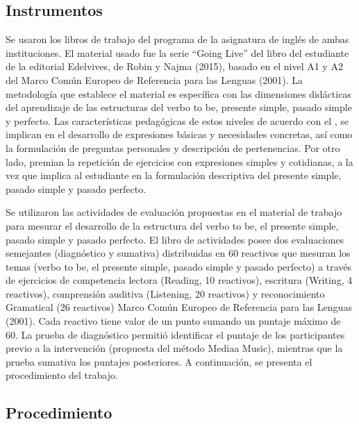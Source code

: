 \documentclass[spanish]{textolivre}
\begin{document}
\subsection{Instrumentos}

Se usaron los libros de trabajo del programa de la asignatura de inglés de ambas instituciones. El material usado fue la serie “Going Live” del libro del estudiante de la editorial Edelvives, de Robin y Najma (2015), basado en el nivel A1 y A2 del Marco Común Europeo de Referencia para las Lenguas (2001). La metodología que establece el material es específica con las dimensiones didácticas del aprendizaje de las estructuras del verbo to be, presente simple, pasado simple y perfecto. Las características pedagógicas de estos niveles de acuerdo con el \textcite{mcerl2001}, se implican en el desarrollo de expresiones básicas y necesidades concretas, así como la formulación de preguntas personales y descripción de pertenencias. Por otro lado, premian la repetición de ejercicios con expresiones simples y cotidianas, a la vez que implica al estudiante en la formulación descriptiva del presente simple, pasado simple y pasado perfecto.

Se utilizaron las actividades de evaluación propuestas en el material de trabajo para mesurar el desarrollo de la estructura del verbo to be, el presente simple, pasado simple y pasado perfecto. El libro de actividades posee dos evaluaciones semejantes (diagnóstico y sumativa) distribuidas en 60 reactivos que mesuran los temas (verbo to be, el presente simple, pasado simple y pasado perfecto) a través de ejercicios de competencia lectora (Reading, 10 reactivos), escritura (Writing, 4 reactivos), comprensión auditiva (Listening, 20 reactivos) y reconocimiento Gramatical (26 reactivos) Marco Común Europeo de Referencia para las Lenguas (2001). Cada reactivo tiene valor de un punto sumando un puntaje máximo de 60. La prueba de diagnóstico permitió identificar el puntaje de los participantes previo a la intervención (propuesta del método Mediaa Music), mientras que la prueba sumativa los puntajes posteriores. A continuación, se presenta el procedimiento del trabajo.


\subsection{Procedimiento}
\end{document}
